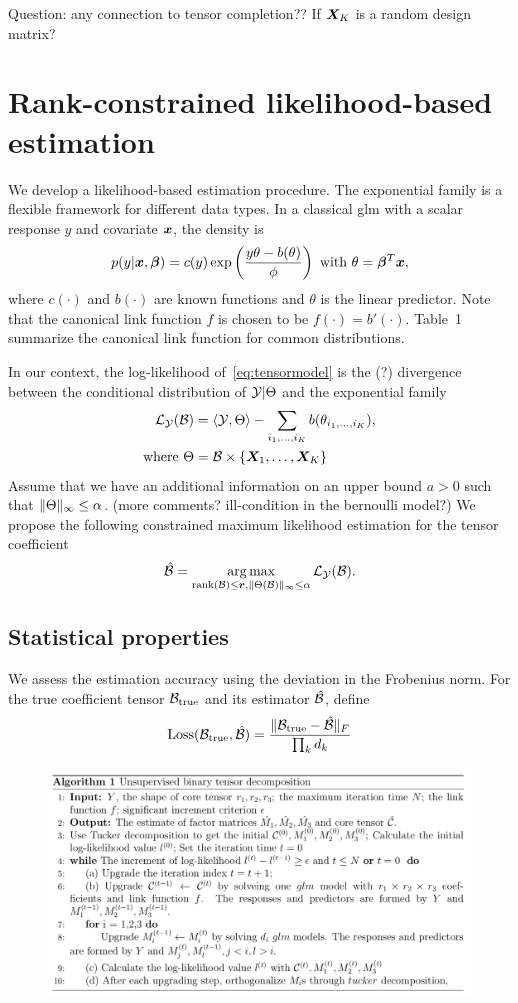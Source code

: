 \documentclass[twoside]{article}
\theoremstyle{plain}
\theoremstyle{definition}
\begin{document}
Question: any connection to tensor completion?? If $\bm X_K$ is a random design matrix? 

\section{Rank-constrained likelihood-based estimation}
We develop a likelihood-based estimation procedure. The exponential family is a flexible framework for different data types. In a classical glm with a scalar response $y$ and covariate $\bm x$, the density is 
\[
p(y|\bm x, \boldsymbol{\beta})=c(y)\exp\left({y\theta- b(\theta) \over \phi}\right)\ \text{with}\ \theta=\boldsymbol{\beta}^T\bm x,
\]
where $c(\cdot)$ and $b(\cdot)$ are known functions and $\theta$ is the linear predictor. Note that the canonical link function $f$ is chosen to be $f(\cdot)=b'(\cdot)$. Table~1 summarize the canonical link function for common distributions. 

In our context, the log-likelihood of~\eqref{eq:tensormodel} is the (?) divergence between the conditional distribution of $\mathcal{Y}|\Theta$ and the exponential family
\begin{align}
\mathcal{L}_{\mathcal{Y}}(\mathcal{B})&=\langle \mathcal{Y}, \Theta \rangle - \sum_{i_1,\ldots,i_K} b(\theta_{i_1,\ldots,i_K}),\\
\text{where}\ \Theta&=\mathcal{B}\times\{\bm X_1,\ldots,\bm X_K\}
\end{align}
Assume that we have an additional information on an upper bound $a>0$ such that $\lVert\Theta\rVert_\infty\leq \alpha$. (more comments? ill-condition in the bernoulli model?)
We propose the following constrained maximum likelihood estimation for the tensor coefficient
\[
\hat {\mathcal{B}}=\operatorname*{arg\,max}_{\text{rank}(\mathcal{B})\leq \bm{r}, \lVert\Theta(\mathcal{B})\rVert_\infty\leq \alpha} \mathcal{L}_{\mathcal{Y}}(\mathcal{B}).
\]
\subsection{Statistical properties}
We assess the estimation accuracy using the deviation in the Frobenius norm. For the true coefficient tensor $\mathcal{B}_{\text{true}}$ and its estimator $\hat {\mathcal{B}}$, define
\[
\text{Loss}(\mathcal{B}_{\text{true}}, \hat {\mathcal{B}})={\lVert\mathcal{B}_{\text{true}}- \hat {\mathcal{B}}\rVert_F \over \prod_k d_k}
\]

\begin{figure}
\begin{center}
\includegraphics[width=17.5cm]{unsupervised.png}
  \end{center}
  \end{figure}
  
\end{document}
